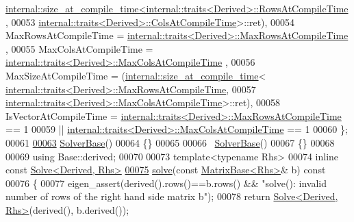 \begin{DoxyCode}
      \hyperlink{struct_eigen_1_1internal_1_1size__at__compile__time}{internal::size\_at\_compile\_time<internal::traits<Derived>::RowsAtCompileTime}
      ,
00053                                                           
      \hyperlink{struct_eigen_1_1internal_1_1traits}{internal::traits<Derived>::ColsAtCompileTime}>::ret),
00054       MaxRowsAtCompileTime = \hyperlink{struct_eigen_1_1internal_1_1traits}{internal::traits<Derived>::MaxRowsAtCompileTime}
      ,
00055       MaxColsAtCompileTime = \hyperlink{struct_eigen_1_1internal_1_1traits}{internal::traits<Derived>::MaxColsAtCompileTime}
      ,
00056       MaxSizeAtCompileTime = (\hyperlink{struct_eigen_1_1internal_1_1size__at__compile__time}{internal::size\_at\_compile\_time}<
      \hyperlink{struct_eigen_1_1internal_1_1traits}{internal::traits<Derived>::MaxRowsAtCompileTime},
00057                                                              
      \hyperlink{struct_eigen_1_1internal_1_1traits}{internal::traits<Derived>::MaxColsAtCompileTime}>::ret),
00058       IsVectorAtCompileTime = \hyperlink{struct_eigen_1_1internal_1_1traits}{internal::traits<Derived>::MaxRowsAtCompileTime}
       == 1
00059                            || \hyperlink{struct_eigen_1_1internal_1_1traits}{internal::traits<Derived>::MaxColsAtCompileTime}
       == 1
00060     \};
00061 
\hyperlink{class_eigen_1_1_solver_base_a4d5e5baddfba3790ab1a5f247dcc4dc1}{00063}     \hyperlink{class_eigen_1_1_solver_base_a4d5e5baddfba3790ab1a5f247dcc4dc1}{SolverBase}()
00064     \{\}
00065 
00066     ~\hyperlink{class_eigen_1_1_solver_base}{SolverBase}()
00067     \{\}
00068 
00069     \textcolor{keyword}{using} Base::derived;
00070 
00073     \textcolor{keyword}{template}<\textcolor{keyword}{typename} Rhs>
00074     \textcolor{keyword}{inline} \textcolor{keyword}{const} \hyperlink{group___core___module_class_eigen_1_1_solve}{Solve<Derived, Rhs>}
\hyperlink{class_eigen_1_1_solver_base_a7fd647d110487799205df6f99547879d}{00075}     \hyperlink{class_eigen_1_1_solver_base_a7fd647d110487799205df6f99547879d}{solve}(\textcolor{keyword}{const} \hyperlink{group___core___module_class_eigen_1_1_matrix_base}{MatrixBase<Rhs>}& b)\textcolor{keyword}{ const}
00076 \textcolor{keyword}{    }\{
00077       eigen\_assert(derived().rows()==b.rows() && \textcolor{stringliteral}{"solve(): invalid number of rows of the right hand side
       matrix b"});
00078       \textcolor{keywordflow}{return} \hyperlink{group___core___module_class_eigen_1_1_solve}{Solve<Derived, Rhs>}(derived(), b.derived());

\end{DoxyCode}

